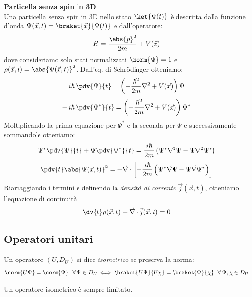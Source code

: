 \begin{example}
    \textbf{Particella senza spin in 3D}\\
    Una particella senza spin in 3D nello stato \(\ket{\Psi(t)}\) è descritta dalla funzione d'onda \(\Psi(\vec{x},t)=\braket{\vec{x}}{\Psi(t)}\) e dall'operatore:
    \[
        H= \frac{\abs{\vec{p}}^2}{2m}+ V(\vec{x})
    \]
    dove consideriamo solo stati normalizzati \(\norm{\Psi}= 1\) e \(\rho(\vec{x},t)= \abs{\Psi(\vec{x},t)}^2\).
    Dall'eq. di Schrödinger otteniamo:
    \[
        i\hbar\,\pdv{\Psi}{t}
        = \left( -\frac{\hbar^2}{2m}\nabla^2 + V(\vec{x}) \right)\Psi
    \]
    \[
        -\,i\hbar\,\pdv{\Psi^*}{t}
        = \left( -\frac{\hbar^2}{2m}\nabla^2 + V(\vec{x}) \right)\Psi^*
    \]
    Moltiplicando la prima equazione per \(\Psi^*\) e la seconda per \(\Psi\) e successivamente sommandole otteniamo:
    \[
        \Psi^* \pdv{\Psi}{t} + \Psi \pdv{\Psi^*}{t}
        = \frac{i\hbar}{2m}\left( \Psi^* \nabla^2 \Psi - \Psi \nabla^2 \Psi^* \right)
    \]
    \[
        \pdv{t} \abs{\Psi(\vec{x},t)}^2
        = - \vec{\nabla} \cdot \left[ -\frac{i\hbar}{2m}\left( \Psi^* \vec{\nabla} \Psi - \Psi \vec{\nabla} \Psi^* \right) \right]
    \]
    Riarraggiando i termini e definendo la \textit{densità di corrente} \(\vec{j}(\vec{x},t)\), otteniamo l'equazione di continuità:
    \begin{equation}
        \dv{t}\rho(\vec{x},t) + \vec{\nabla}\cdot  \vec{j}(\vec{x},t)=0
    \end{equation}
\end{example}




\subsection{Operatori unitari}

\begin{definition}
    Un operatore \((U, D_U)\) si dice \textit{isometrico} se preserva la norma:
    \begin{equation}
        \norm{U\Psi}= \norm{\Psi} \ \ \forall\,\Psi \in D_U \iff \braket{U\Psi}{U\chi}= \braket{\Psi}{\chi} \ \ \forall\, \Psi, \chi \in D_U
    \end{equation}
\end{definition}
\begin{remark}
    Un operatore isometrico è sempre limitato.
\end{remark}

